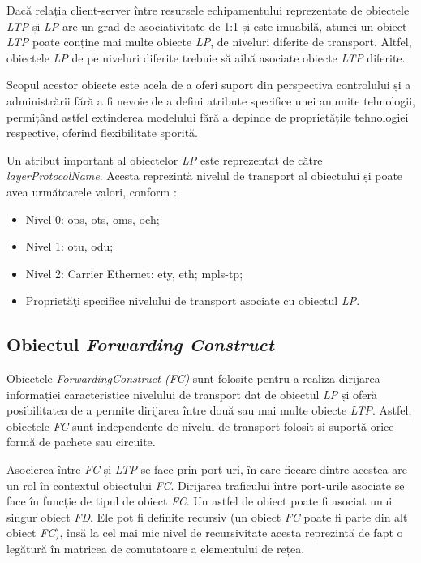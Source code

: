 Dacă relația client-server între resursele echipamentului reprezentate de obiectele \textit{LTP} și \textit{LP} are un grad de asociativitate de 1:1 și este imuabilă, atunci un obiect \textit{LTP} poate conține mai multe obiecte \textit{LP}, de niveluri diferite de transport. Altfel, obiectele \textit{LP} de pe niveluri diferite trebuie să aibă asociate obiecte \textit{LTP} diferite.

Scopul acestor obiecte este acela de a oferi suport din perspectiva controlului și a administrării fără a fi nevoie de a defini atribute specifice unei anumite tehnologii, permițând astfel extinderea modelului fără a depinde de proprietățile tehnologiei respective, oferind flexibilitate sporită.

Un atribut important al obiectelor \textit{LP} este reprezentat de către \textit{layerProtocolName}. Acesta reprezintă nivelul de transport al obiectului și poate avea următoarele valori, conform \cite{onftr512v1.2}:

\begin{itemize}
	\item Nivel 0: \gls{ops}, \gls{ots}, \gls{oms}, \gls{och};
	\item Nivel 1: \gls{otu}, \gls{odu};
	\item Nivel 2: Carrier Ethernet: \gls{ety}, \gls{eth}; \gls{mpls-tp};
	\item Proprietăţi specifice nivelului de transport asociate cu obiectul \textit{LP}.
\end{itemize}

\subsection{Obiectul \textit{Forwarding Construct}}

Obiectele \textit{ForwardingConstruct (FC)} sunt folosite pentru a realiza dirijarea informației caracteristice nivelului de transport dat de obiectul \textit{LP} și oferă posibilitatea de a permite dirijarea între două sau mai multe obiecte \textit{LTP}. Astfel, obiectele \textit{FC} sunt independente de nivelul de transport folosit și suportă orice formă de pachete sau circuite.

Asocierea între \textit{FC} și \textit{LTP} se face prin port-uri, în care fiecare dintre acestea are un rol în contextul obiectului \textit{FC}. Dirijarea traficului între port-urile asociate se face în funcție de tipul de obiect \textit{FC}. Un astfel de obiect poate fi asociat unui singur obiect \textit{FD}. Ele pot fi definite recursiv (un obiect \textit{FC} poate fi parte din alt obiect \textit{FC}), însă la cel mai mic nivel de recursivitate acesta reprezintă de fapt o legătură în matricea de comutatoare a elementului de rețea.

